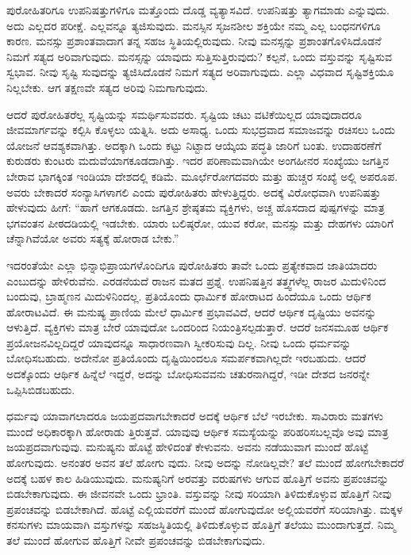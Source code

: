 ಪುರೋಹಿತರಿಗೂ ಉಪನಿಷತ್ತುಗಳಿಗೂ ಮತ್ತೊಂದು ದೊಡ್ಡ ವ್ಯತ್ಯಾಸವಿದೆ. ಉಪನಿಷತ್ತು ತ್ಯಾಗಮಾಡು ಎನ್ನುವುದು. ಅದು ಎಲ್ಲದರ ಪರೀಕ್ಷೆ. ಎಲ್ಲವನ್ನೂ ತ್ಯಜಿಸುವುದು. ಮನಸ್ಸಿನ ಸೃಜನಶೀಲ ಶಕ್ತಿಯೇ ನಮ್ಮ ಎಲ್ಲ ಬಂಧನಗಳಿಗೂ ಕಾರಣ. ಮನಸ್ಸು ಪ್ರಶಾಂತವಾದಾಗ ತನ್ನ ಸಹಜ ಸ್ಥಿತಿಯಲ್ಲಿರುವುದು. ನೀವು ಮನಸ್ಸನ್ನು ಪ್ರಶಾಂತಗೊಳಿಸಿದೊಡನೆ ನಿಮಗೆ ಸತ್ಯದ ಅರಿವಾಗುವುದು. ಮನಸ್ಸನ್ನು ಯಾವುದು ಸುತ್ತಿಸುತ್ತಿರುವುದು? ಕಲ್ಪನೆ, ಒಂದು ವಸ್ತುವನ್ನು ಸೃಷ್ಟಿಸುವ ಸ್ವಭಾವ. ನೀವು ಸೃಷ್ಟಿ ಸುವುದನ್ನು ತ್ಯಜಿಸಿದೊಡನೆ ನಿಮಗೆ ಸತ್ಯದ ಅರಿವಾಗುವುದು. ಎಲ್ಲಾ ವಿಧವಾದ ಸೃಷ್ಟಿಶಕ್ತಿಯೂ ನಿಲ್ಲಬೇಕು. ಆಗ ತಕ್ಷಣವೇ ಸತ್ಯದ ಅರಿವು ನಿಮಗಾಗುವುದು.

ಆದರೆ ಪುರೋಹಿತರೆಲ್ಲ ಸೃಷ್ಟಿಯನ್ನು ಸಮರ್ಥಿಸುವವರು. ಸೃಷ್ಟಿಯ ಚಟು ವಟಿಕೆಯಿಲ್ಲದ ಯಾವುದಾದರೂ ಜೀವಮಾರ್ಗವನ್ನು ಕಲ್ಪಿಸಿ ಕೊಳ್ಳಲು ಯತ್ನಿಸಿ. ಅದು ಅಸಾಧ್ಯ. ಒಂದು ಸುಭದ್ರವಾದ ಸಮಾಜವನ್ನು ರಚಿಸಲು ಒಂದು ಯೋಜನೆ ಆವಶ್ಯಕವಾಗಿತ್ತು. ಅದಕ್ಕಾಗಿ ಒಂದು ಕಟ್ಟು ನಿಟ್ಟಾದ ಆಯ್ಕೆಯ ಪದ್ಧತಿ ಜಾರಿಗೆ ಬಂತು. ಉದಾಹರಣೆಗೆ ಕುರುಡರು ಕುಂಟರು ಮದುವೆಯಾಗಕೂಡದಾಗಿತ್ತು. ಇದರ ಪರಿಣಾಮವಾಗಿಯೇ ಅಂಗಹೀನರ ಸಂಖ್ಯೆಯು ಜಗತ್ತಿನ ಬೇರಾವ ಭಾಗಕ್ಕಿಂತ ಇಂಡಿಯಾ ದೇಶದಲ್ಲಿ ಕಡಿಮೆ. ಮೂರ್ಛೆರೋಗದವರು ಮತ್ತು ಹುಚ್ಚರ ಸಂಖ್ಯೆ ಅಲ್ಲಿ ಅಪರೂಪ. ಅವರು ಬೇಕಾದರೆ ಸಂನ್ಯಾಸಿಗಳಾಗಲಿ ಎಂದು ಪುರೋಹಿತರು ಹೇಳುತ್ತಿದ್ದರು. ಅದಕ್ಕೆ ವಿರೋಧವಾಗಿ ಉಪನಿಷತ್ತು ಹೇಳುವುದು ಹೀಗೆ: “ಹಾಗೆ ಆಗಕೂಡದು. ಜಗತ್ತಿನ ಶ್ರೇಷ್ಠತಮ ವ್ಯಕ್ತಿಗಳು, ಅಚ್ಚ ಹೊಸದಾದ ಪುಷ್ಪಗಳನ್ನು ಮಾತ್ರ ಭಗವಂತನ ಪೀಠದಡಿಯಲ್ಲಿ ಇಡಬೇಕು. ಯಾರು ಬಲಿಷ್ಠರೋ, ಯುವ ಕರೋ, ಮನಸ್ಸು ಮತ್ತು ದೇಹಗಳು ಯಾರಿಗೆ ಚೆನ್ನಾಗಿವೆಯೋ ಅವರು ಸತ್ಯಕ್ಕೆ ಹೋರಾಡ ಬೇಕು.”

ಇದರಂತೆಯೇ ಎಲ್ಲಾ ಭಿನ್ನಾಭಿಪ್ರಾಯಗಳೊಂದಿಗೂ ಪುರೋಹಿತರು ತಾವೇ ಒಂದು ಪ್ರತ್ಯೇಕವಾದ ಜಾತಿಯಾದರು ಎಂಬುದನ್ನು ಹೇಳಿರುವೆನು. ಎರಡನೆಯದೆ ರಾಜನ ಮತದ ಪ್ರಶ್ನೆ. ಉಪನಿಷತ್ತಿನ ತತ್ತ್ವಗಳೆಲ್ಲ ರಾಜರ ಮಿದುಳಿನಿಂದ ಬಂದುವು, ಬ್ರಾಹ್ಮಣನ ಮಿದುಳಿನಿಂದಲ್ಲ. ಪ್ರತಿಯೊಂದು ಧಾರ್ಮಿಕ ಹೋರಾಟದ ಹಿಂದೆಯೂ ಒಂದು ಆರ್ಥಿಕ ಹೋರಾಟವಿದೆ. ಈ ಮನುಷ್ಯ ಪ್ರಾಣಿಯ ಮೇಲೆ ಧಾರ್ಮಿಕ ಪ್ರಭಾವವಿದೆ, ಆದರೆ ಆರ್ಥಿಕ ದೃಷ್ಟಿಯು ಅವನನ್ನು ಆಳುತ್ತಿದೆ. ವ್ಯಕ್ತಿಗಳು ಮಾತ್ರ ಬೇರೆ ಯಾವುದೋ ಒಂದರಿಂದ ನಿಯಂತ್ರಿಸಲ್ಪಡುತ್ತಾರೆ. ಆದರೆ ಜನಸಮೂಹ ಆರ್ಥಿಕ ಪ್ರಯೋಜನವಿಲ್ಲದಿದ್ದರೆ ಯಾವುದನ್ನೂ ಸಾಧಾರಣವಾಗಿ ಸ್ವೀಕರಿಸುವು ದಿಲ್ಲ. ನೀವು ಒಂದು ಧರ್ಮವನ್ನು ಬೋಧಿಸಬಹುದು. ಅದೇನೋ ಪ್ರತಿಯೊಂದು ದೃಷ್ಟಿಯಿಂದಲೂ ಸಮರ್ಪಕವಾಗಿಲ್ಲದೇ ಇರಬಹುದು. ಆದರೆ ಅದಕ್ಕೊಂದು ಆರ್ಥಿಕ ಹಿನ್ನೆಲೆ ಇದ್ದರೆ, ಅದನ್ನು ಬೋಧಿಸುವವನು ಚತುರನಾಗಿದ್ದರೆ, ಇಡೀ ದೇಶದ ಜನರನ್ನೇ ಒಪ್ಪಿಸಿಬಿಡಬಹುದು.

ಧರ್ಮವು ಯಾವಾಗಲಾದರೂ ಜಯಪ್ರದವಾಗಬೇಕಾದರೆ ಅದಕ್ಕೆ ಆರ್ಥಿಕ ಬೆಲೆ ಇರಬೇಕು. ಸಾವಿರಾರು ಮತಗಳು ಮುಂದೆ ಅಧಿಕಾರಕ್ಕಾಗಿ ಹೋರಾಡು ತ್ತಿರುತ್ತವೆ. ಯಾವುವು ಆರ್ಥಿಕ ಸಮಸ್ಯೆಯನ್ನು ಪರಿಹರಿಸಬಲ್ಲವೊ ಅವು ಮಾತ್ರ ಜಯಪ್ರದವಾಗುವುವು. ಮನುಷ್ಯನು ಹೊಟ್ಟೆ ಹೇಳಿದಂತೆ ಕೇಳುವನು. ಅವನು ನಡೆಯುವಾಗ ಮುಂದೆ ಹೊಟ್ಟೆ ಹೋಗುವುದು. ಅನಂತರ ಅವನ ತಲೆ ಹೋಗು ವುದು. ನೀವು ಅದನ್ನು ನೋಡಿಲ್ಲವೇ? ತಲೆ ಮುಂದೆ ಹೋಗಬೇಕಾದರೆ ಅದಕ್ಕೆ ಬಹಳ ಕಾಲ ಹಿಡಿಯುವುದು. ಮನುಷ್ಯನಿಗೆ ಅರವತ್ತು ವರುಷಗಳು ಆಗುವ ಹೊತ್ತಿಗೆ ಅವನು ಪ್ರಪಂಚವನ್ನು ಬಿಡಬೇಕಾಗುವುದು. ಈ ಜೀವನವೇ ಒಂದು ಭ್ರಾಂತಿ. ವಸ್ತುವನ್ನು ನೀವು ಸರಿಯಾಗಿ ತಿಳಿದುಕೊಳ್ಳುವ ಹೊತ್ತಿಗೆ ನೀವು ಪ್ರಪಂಚವನ್ನು ಬಿಡಬೇಕಾಗಿದೆ. ಹೊಟ್ಟೆ ಎಲ್ಲಿಯವರೆಗೆ ಮುಂದೆ ಹೋಗುವುದೋ ಅಲ್ಲಿಯವರೆಗೆ ಸರಿಯಾಗಿತ್ತು. ಮಕ್ಕಳ ಕನಸುಗಳು ಮಾಯವಾಗಿ ವಸ್ತುಗಳನ್ನು ಸಹಜಸ್ಥಿತಿಯಲ್ಲಿ ತಿಳಿದುಕೊಳ್ಳುವ ಹೊತ್ತಿಗೆ ತಲೆಯು ಮುಂದಾಗುತ್ತದೆ. ನಿಮ್ಮ ತಲೆ ಮುಂದೆ ಹೋಗುವ ಹೊತ್ತಿಗೆ ನೀವೇ ಪ್ರಪಂಚವನ್ನು ಬಿಡಬೇಕಾಗುವುದು.

